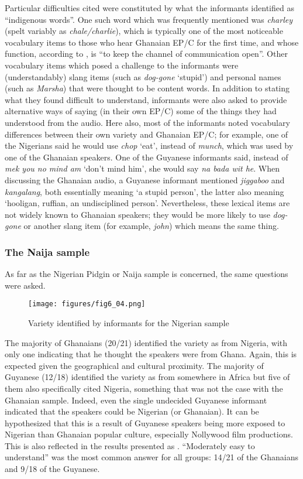 \documentclass[output=paper,colorlinks,citecolor=brown]{langscibook}
\begin{document}
Particular difficulties cited were constituted by what the informants identified as “indigenous words”. One such word which was frequently mentioned was \emph{charley} (spelt variably as \emph{chale/charlie}), which is typically one of the most noticeable vocabulary items to those who hear Ghanaian EP/C for the first time, and whose function, according to \citet[276]{Huber_1999b}, is “to keep the channel of communication open”. Other vocabulary items which posed a challenge to the informants were (understandably) slang items (such as \emph{dog-gone} ‘stupid’) and personal names (such as \emph{Marsha}) that were thought to be content words. In addition to stating what they found difficult to understand, informants were also asked to provide alternative ways of saying (in their own EP/C) some of the things they had understood from the audio. Here also, most of the informants noted vocabulary differences between their own variety and Ghanaian EP/C; for example, one of the Nigerians said he would use \emph{chop} ‘eat’, instead of \emph{munch}, which was used by one of the Ghanaian speakers. One of the Guyanese informants said, instead of \emph{mek you no mind am} ‘don’t mind him’, she would say \emph{na bada wit he}. When discussing the Ghanaian audio, a Guyanese informant mentioned \emph{jiggaboo} and \emph{kangalang}, both essentially meaning ‘a stupid person’, the latter also meaning ‘hooligan, ruffian, an undisciplined person’. Nevertheless, these lexical items are not widely known to Ghanaian speakers; they would be more likely to use \emph{dog-gone} or another slang item (for example, \emph{john}) which means the same thing. 


\subsubsection{The Naija sample}


As far as the Nigerian Pidgin or Naija sample is concerned, the same questions were asked.

\begin{figure}
    \texttt{[image: figures/fig6\_04.png]}
    \caption{Variety identified by informants for the Nigerian sample}
    \label{fig:fig6_04}
\end{figure}

The majority of Ghanaians (20/21) identified the variety as from Nigeria, with only one indicating that he thought the speakers were from Ghana. Again, this is expected given the geographical and cultural proximity. The majority of Guyanese (12/18) identified the variety as from somewhere in Africa but five of them also specifically cited Nigeria, something that was not the case with the Ghanaian sample. Indeed, even the single undecided Guyanese informant indicated that the speakers could be Nigerian (or Ghanaian). It can be hypothesized that this is a result of Guyanese speakers being more exposed to Nigerian than Ghanaian popular culture, especially Nollywood film productions. This is also reflected in the results presented as . “Moderately easy to understand” was the most common answer for all groups: 14/21 of the Ghanaians and 9/18 of the Guyanese.
\end{document}
